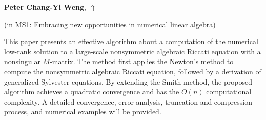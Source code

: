 \documentclass[ILAS2025-program.tex]{subfiles}
\begin{document}
     \hypertarget{down0273}{}\begin{ilasabstract}
    
    \textbf{Peter Chang-Yi Weng},  \hfill \hyperlink{up0273}{$\Uparrow$}
    
    (in {\color{mstitle}MS1: Embracing new opportunities in numerical linear algebra})
        
        \mtskip
    This paper presents an effective algorithm about a computation of the numerical
low-rank solution to a large-scale nonsymmetric algebraic Riccati equation with
a nonsingular $M$-matrix. The method first applies the Newton’s method to compute the nonsymmetric algebraic Riccati equation, followed by a derivation of
generalized Sylvester equations. By extending the Smith method, the proposed
algorithm achieves a quadratic convergence and has the $O(n)$ computational
complexity. A detailed convergence, error analysis, truncation and compression
process, and numerical examples will be provided.\end{ilasabstract}
\end{document}
